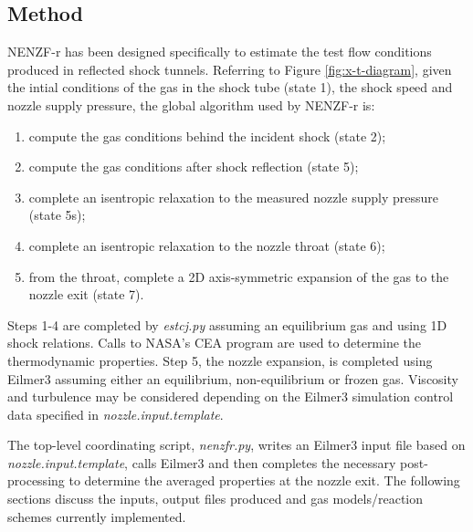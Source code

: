 \subsection{Method}
NENZF-r has been designed specifically to estimate the test flow conditions produced in reflected shock tunnels. Referring to Figure \ref{fig:x-t-diagram}, given the intial conditions of the gas in the shock tube (state 1), the shock speed and nozzle supply pressure, the global algorithm used by NENZF-r is:
\begin{enumerate}
\item compute the gas conditions behind the incident shock (state 2);
\item compute the gas conditions after shock reflection (state 5);
\item complete an isentropic relaxation to the measured nozzle supply pressure (state 5s);
\item complete an isentropic relaxation to the nozzle throat (state 6);
\item from the throat, complete a 2D axis-symmetric expansion of the gas to the nozzle exit (state 7).
\end{enumerate}
Steps 1-4 are completed by \textit{estcj.py} assuming an equilibrium gas and using 1D shock relations. Calls to NASA's CEA \cite{Gordon_1994} program are used to determine the thermodynamic properties. Step 5, the nozzle expansion, is completed using Eilmer3 assuming either an equilibrium, non-equilibrium or frozen gas. Viscosity and turbulence may be considered depending on the Eilmer3 simulation control data specified in \textit{nozzle.input.template}. 

The top-level coordinating script, \textit{nenzfr.py}, writes an Eilmer3 input file based on \textit{nozzle.input.template}, calls Eilmer3 and then completes the necessary post-processing to determine the averaged properties at the nozzle exit. The following sections discuss the inputs, output files produced and gas models/reaction schemes currently implemented. %


